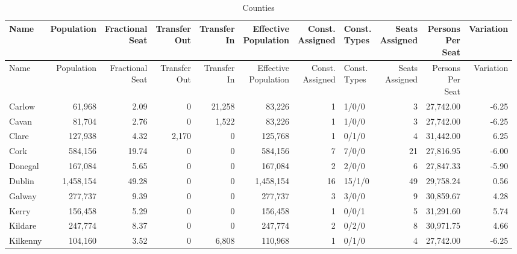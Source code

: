 \documentclass[a4paper]{article}
\begin{document}
\begin{longtable}{lrrrrrrlrrr}
\caption{Counties}
\\ \toprule
Name &Population &\shortstack{Fractional\\Seat} &\shortstack{Transfer\\Out} &\shortstack{Transfer\\In} &\shortstack{Effective\\Population} &\shortstack{Const.\\Assigned} &\shortstack{Const.\\Types} &\shortstack{Seats\\Assigned} &\shortstack{Persons\\Per\\Seat} &Variation \\ \midrule
\endfirsthead
\toprule
Name &Population &\shortstack{Fractional\\Seat} &\shortstack{Transfer\\Out} &\shortstack{Transfer\\In} &\shortstack{Effective\\Population} &\shortstack{Const.\\Assigned} &\shortstack{Const.\\Types} &\shortstack{Seats\\Assigned} &\shortstack{Persons\\Per\\Seat} &Variation \\ \midrule
\endhead
\bottomrule
\endfoot
Carlow&61,968& 2.09&0&21,258&83,226&1&1/0/0&3&27,742.00&-6.25\\ 
Cavan&81,704& 2.76&0&1,522&83,226&1&1/0/0&3&27,742.00&-6.25\\ 
Clare&127,938& 4.32&2,170&0&125,768&1&0/1/0&4&31,442.00& 6.25\\ 
Cork&584,156&19.74&0&0&584,156&7&7/0/0&21&27,816.95&-6.00\\ 
Donegal&167,084& 5.65&0&0&167,084&2&2/0/0&6&27,847.33&-5.90\\ 
Dublin&1,458,154&49.28&0&0&1,458,154&16&15/1/0&49&29,758.24& 0.56\\ 
Galway&277,737& 9.39&0&0&277,737&3&3/0/0&9&30,859.67& 4.28\\ 
Kerry&156,458& 5.29&0&0&156,458&1&0/0/1&5&31,291.60& 5.74\\ 
Kildare&247,774& 8.37&0&0&247,774&2&0/2/0&8&30,971.75& 4.66\\ 
Kilkenny&104,160& 3.52&0&6,808&110,968&1&0/1/0&4&27,742.00&-6.25\\ 

\end{longtable}
\end{document}
